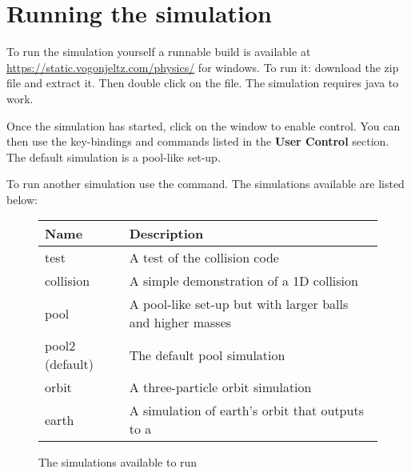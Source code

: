 \section{Running the simulation}
	To run the simulation yourself a runnable build is available at \url{https://static.vogonjeltz.com/physics/} for windows. To run it: download the zip file and extract it. Then double click on the  file. The simulation requires java to work.
	
	Once the simulation has started, click on the window to enable control. You can then use the key-bindings and commands listed in the \textbf{User Control} section. The default simulation is a pool-like set-up.
	
	To run another simulation use the  command. The simulations available are listed below:
	
	\begin{figure}[h]
		\centering
		\begin{tabular}{ | l | l |}
			\hline
			\textbf{Name} & \textbf{Description} \\ \hline
			test & A test of the collision code \\ \hline
			collision & A simple demonstration of a 1D collision \\ \hline
			pool & A pool-like set-up but with larger balls and higher masses \\ \hline
			pool2 (default) & The default pool simulation \\ \hline
			orbit & A three-particle orbit simulation \\ \hline
			earth & A simulation of earth's orbit that outputs to a \code{.csv}\\ \hline
		\end{tabular}
		\caption{The simulations available to run}
		\label{table:simulations}
	\end{figure}